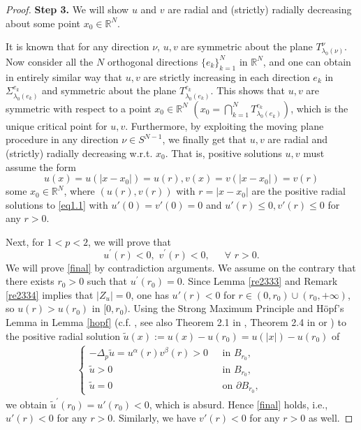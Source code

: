 \documentclass[12pt]{amsart}
\theoremstyle{definition}
\theoremstyle{remark}
\theoremstyle{conclusion}
\theoremstyle{conjecture}
\numberwithin{equation}{section}
\newcommand{\R}{\mathbb{R}}
\begin{document}
\begin{proof}
\medskip

{\bf Step 3.} We will show $u$ and $v$ are radial and (strictly) radially decreasing about some point $x_0\in\R^N$.

It is known that for any direction $\nu$, $u, v$ are symmetric about the plane $T^\nu_{\lambda_0(\nu)}$. Now consider all the $N$ orthogonal directions $\{e_k\}_{k=1}^N$ in $\R^N$, and one can obtain in entirely similar way that $u, v$ are strictly increasing in each direction $e_k$ in $\Sigma^{e_k}_{\lambda_0(e_k)}$ and symmetric about the plane $T^{e_k}_{\lambda_0(e_k)}$. This shows that $u,v$ are symmetric with respect to a point $x_0\in\R^N$ $(x_0 = \bigcap^N_{k=1}T^{e_k}_{\lambda_0(e_k)})$, which is the unique critical point for $u, v$. Furthermore, by exploiting the moving plane procedure in any direction $\nu\in S^{N-1}$, we finally get that $u, v$ are radial and (strictly) radially decreasing w.r.t. $x_{0}$. That is, positive solutions $u,v$ must assume the form
\[u(x)=u(|x-x_{0}|)=u(r), v(x)=v(|x-x_{0}|)=v(r) \]
some $x_{0}\in\mathbb{R}^{N}$, where $(u(r), v(r))$ with $r=|x-x_0|$ are the positive radial solutions to \eqref{eq1.1} with $u'(0)=v'(0)=0$ and $u'(r)\leq0, v'(r)\leq0 $ for any $r>0$.

\smallskip

Next, for $1<p<2$, we will prove that
\begin{equation}\label{final}
  u^\prime (r) < 0, \,\,v^\prime (r) < 0,\quad \,\,\,\forall \,\, r>0.
\end{equation}
We will prove \eqref{final} by contradiction arguments. We assume on the contrary that there exists $r_0>0$ such that $u^\prime (r_0) = 0$. Since Lemma \ref{re2333} and Remark \ref{re2334} implies that $|Z_u|=0$, one has $u'(r)<0$ for $r\in(0,r_{0})\cup(r_{0},+\infty)$, so $u(r)>u(r_0)$ in $[0,r_0)$. Using the Strong Maximum Principle and H\"{o}pf's Lemma in Lemma \ref{hopf} (c.f. \cite{JLV}, see also Theorem 2.1 in \cite{LDBS04}, Theorem 2.4 in \cite{LDSMLMSB} or \cite{LD,PS}) to the positive radial solution $\tilde{u}(x):=u(x)-u(r_0)=u(|x|)-u(r_{0})$ of
\begin{align*}
\left\{ \begin{array}{ll} \displaystyle
-\Delta_p \tilde{u}  = u^\alpha (r) v^\beta(r) > 0  \,\,\,\,&\mbox{in}\, \,B_{r_0}, \\
\tilde{u}>0   &\mbox{in}\,\,  B_{r_0},\\
\tilde{u}=0   &\mbox{on}\,\, \partial B_{r_0},
\end{array}
\right.\hspace{1cm}
\end{align*}
we obtain $\tilde{u}^\prime (r_0)=u'(r_{0})<0$, which is absurd. Hence \eqref{final} holds, i.e., $u'(r)<0$ for any $r>0$. Similarly, we have $v'(r)<0$ for any $r>0$ as well.

\end{proof}
\end{document}
